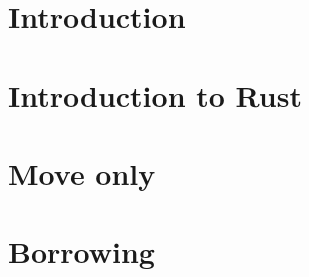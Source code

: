 \documentclass{report}
\begin{document}

%

\tableofcontents

\chapter*{Introduction}


\chapter{Introduction to Rust}


\chapter{Move only}


\chapter{Borrowing}


%

%

%

%

%



\end{document}
